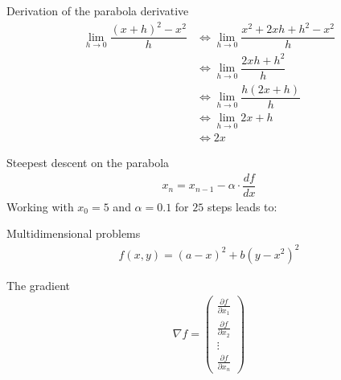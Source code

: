 \documentclass{beamer}
\begin{document}
    \begin{frame}{Derivation of the parabola derivative}
      \begin{align}
          \lim_{h \rightarrow 0} \dfrac{(x + h)^2 - x^2}{h} 
          & \Leftrightarrow \lim_{h \rightarrow 0} \dfrac{x^2 + 2xh + h^2 - x^2}{h}   \\
          & \Leftrightarrow \lim_{h \rightarrow 0} \dfrac{2xh + h^2}{h}  \\
          & \Leftrightarrow \lim_{h \rightarrow 0} \dfrac{h (2x + h)}{h}  \\
          & \Leftrightarrow \lim_{h \rightarrow 0} 2x + h \\
          & \Leftrightarrow 2x
      \end{align}
    \end{frame}

    \begin{frame}{Steepest descent on the parabola}
      \begin{align}
        x_n = x_{n-1} - \alpha \cdot \dfrac{d f}{dx}
      \end{align}
      Working with $x_0 = 5$ and $\alpha = 0.1$ for $25$ steps leads to: 
      \begin{figure}
        
      \end{figure}
    \end{frame}

    \begin{frame}{Multidimensional problems}
      \begin{align}
        f(x, y) = (a - x)^2 + b(y - x^2)^2
      \end{align}
      \begin{figure}
        
      \end{figure}
    \end{frame}

    \begin{frame}{The gradient}
      \begin{align}
        \nabla f = \begin{pmatrix}
          \frac{\partial f}{\partial x_1} \\
          \frac{\partial f}{\partial x_2} \\
          \vdots \\
          \frac{\partial f}{\partial x_n}
        \end{pmatrix}
      \end{align}
    \end{frame}
\end{document}
